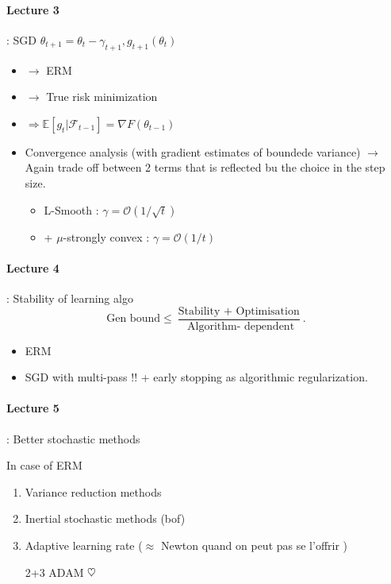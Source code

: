 \paragraph{Lecture 3}: SGD $ \theta _{t+1} = \theta _t - \gamma _{t+1}, g_{t+1}(\theta _t) $ 
\begin{itemize}
    \item $\rightarrow$ ERM 
    \item $\rightarrow$ True risk minimization
    \item $ \Rightarrow \mathbb{E}[g_t | \mathcal{F}_{t-1}] = \nabla F(\theta _{t - 1}) $ 
    \item Convergence analysis (with gradient estimates of boundede variance) $\rightarrow$ Again trade off between 2 terms that is reflected bu the choice in the step size. \begin{itemize}
        \item L-Smooth : $ \gamma = \mathcal{O }(1 / \sqrt{t}) $
        \item + $ \mu$-strongly convex : $ \gamma = \mathcal{O}(1 / t) $  
    \end{itemize}
\end{itemize}
\begin{figure}[H]
    \centering
\end{figure}

\paragraph{Lecture 4}: Stability of learning algo 
\[
    \text{Gen bound} \leq \frac{\text{Stability } + \text{ Optimisation}}{\text{ Algorithm- dependent}}
.\]
\begin{itemize}
    \item ERM
    \item SGD with multi-pass !! + early stopping as algorithmic regularization.
\end{itemize}

\paragraph{Lecture 5}: Better stochastic methods

In case of ERM \begin{enumerate}
    \item Variance reduction methods
    \item Inertial stochastic methods (bof)
    \item Adaptive learning rate ($ \approx  $ Newton quand on peut pas se l'offrir )
    \item[2+3] ADAM $ \ensuremath\heartsuit $ 
\end{enumerate}





